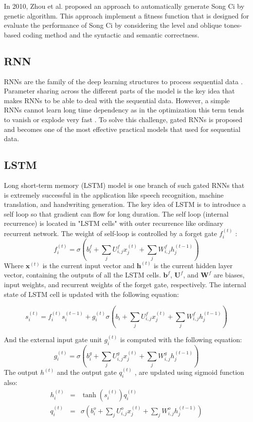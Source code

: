 In 2010, Zhou et al.\cite{zhou2010genetic} proposed an approach to automatically generate Song Ci by genetic algorithm.
%
This approach implement a fitness function that is designed for evaluate the performance of Song Ci by considering the level and oblique tones-based coding method and the syntactic and semantic correctness.


\subsection{RNN}
%
%
RNNs are the family of the deep learning structures to process sequential data  \cite{rumelhart1986}.
%
Parameter sharing across the different parts of the model is the key idea that makes RNNs to be able to deal with the sequential data.
%
However, a simple RNNs cannot learn long time dependency as in the optimization this term tends to vanish or explode very fast \cite{goodfellow2016deeplearning}.
%
To solve this challenge, gated RNNs is proposed and becomes one of the most effective practical models that used for sequential data.

\subsection{LSTM}
Long short-term memory (LSTM) model \cite{hochreiter1997lstm} is one branch of such gated RNNs that is extremely successful in the application like speech recognition, machine translation, and handwriting generation.
%
The key idea of LSTM is to introduce a self loop so that gradient can flow for long duration. The self loop (internal recurrence) is located in "LSTM cells" with outer recurrence like ordinary recurrent network. The weight of self-loop is controlled by a forget gate \(f_i^{(t)}\)
:
\[f_i^{(t)} = \sigma (b_i^f + \sum_{j}U_{i,j}^f x_j^{(t)} +\sum_{j}W_{i,j}^f h_j^{(t-1)} ) \]
Where \(\boldsymbol{x}^{(t)}\) is the current input vector and \(\boldsymbol{h}^{(t)}\) is the current hidden layer vector, containing the outputs of all the LSTM cells. \(\boldsymbol{b}^f\), \(\boldsymbol{U}^f\), and \(\boldsymbol{W}^f\) are biases, input weights, and recurrent weights of the forget gate, respectively. The internal state of LSTM cell is updated with the following equation:
\begin{small}
\[s_i^{(t)} = f_i^{(t)}s_i^{(t-1)}+g_i^{(t)}\sigma(b_i + \sum_{j}U_{i,j}^f x_j^{(t)} +\sum_{j}W_{i,j}^f h_j^{(t-1)} )\]
\end{small}
And the external input gate unit
\(g_i^{(t)} \)
is computed with the following equation:
\[g_i^{(t)} = \sigma (b_i^g + \sum_{j}U_{i,j}^g x_j^{(t)} +\sum_{j}W_{i,j}^g h_j^{(t-1)} ) \]
The output
\(h^{(t)}\)
and the output gate
\(q_i^{(t)}\)
, are updated using sigmoid function also:
\begin{eqnarray*}
h_i^{(t)} &=& \tanh (s_i^{(t)})q_i^{(t)}\\
q_i^{(t)} &=& \sigma (b_i^o + \sum_{j}U_{i,j}^o x_j^{(t)} +\sum_{j}W_{i,j}^o h_j^{(t-1)} )
\end{eqnarray*}


